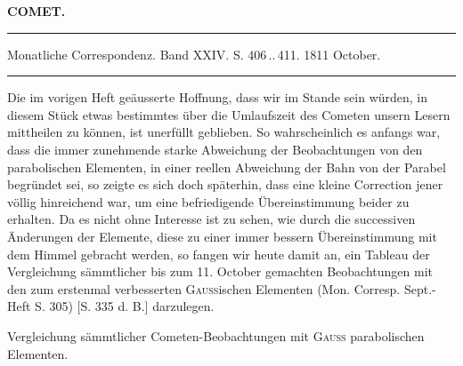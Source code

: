\clearpage{}\hypertarget{native-343-lower}{}\label{native-343-lower}
\begin{center}\textbf{COMET.}\par\vspace{4pt}\hrule\vspace{4pt}\fontsize{10}{12}\selectfont Monatliche Correspondenz. Band XXIV. S. 406\,..\,411. 1811 October.\par\vspace{4pt}\hrule\vspace{4pt}\end{center}

\par\indent Die im vorigen Heft geäusserte Hoffnung, dass wir im Stande sein würden, in diesem Stück etwas bestimmtes über die Umlaufszeit des Cometen unsern Lesern mittheilen zu können, ist unerfüllt geblieben. So wahrscheinlich es anfangs war, dass die immer zunehmende starke Abweichung der Beobachtungen von den parabolischen Elementen, in einer reellen Abweichung der Bahn von der Parabel begründet sei, so zeigte es sich doch späterhin, dass eine kleine Correction jener völlig hinreichend war, um eine befriedigende Übereinstimmung beider zu erhalten. Da es nicht ohne Interesse ist zu sehen, wie durch die successiven Änderungen der Elemente, diese zu einer immer bessern Übereinstimmung mit dem Himmel gebracht werden, so fangen wir heute damit an, ein Tableau der Vergleichung sämmtlicher bis zum 11. October gemachten Beobachtungen mit den zum erstenmal verbesserten \textsc{Gauss}ischen Elementen (Mon. Corresp. Sept.-Heft S. 305) [S. 335 d. B.] darzulegen.

Vergleichung sämmtlicher Cometen-Beobachtungen mit \textsc{Gauss} parabolischen Elementen.

